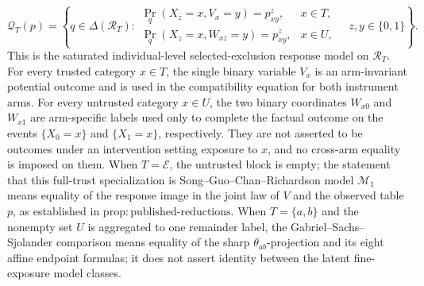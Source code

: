 \[
\mathcal Q_T(p)=\left\{q\in\Delta(\mathcal R_T):
\begin{array}{ll}
\Pr_q(X_z=x,V_x=y)=p^z_{xy},
  &x\in T,\\
\Pr_q(X_z=x,W_{xz}=y)=p^z_{xy},
  &x\in U,
\end{array}
\quad z,y\in\{0,1\}\right\}.
\]
This is the saturated individual-level selected-exclusion response model on \(\mathcal R_T\).  For every trusted category \(x\in T\), the single binary variable \(V_x\) is an arm-invariant potential outcome and is used in the compatibility equation for both instrument arms.  For every untrusted category \(x\in U\), the two binary coordinates \(W_{x0}\) and \(W_{x1}\) are arm-specific labels used only to complete the factual outcome on the events \(\{X_0=x\}\) and \(\{X_1=x\}\), respectively.  They are not asserted to be outcomes under an intervention setting exposure to \(x\), and no cross-arm equality is imposed on them.  When \(T=\mathcal E\), the untrusted block is empty; the statement that this full-trust specialization is Song--Guo--Chan--Richardson model \(\mathcal M_1\) means equality of the response image in the joint law of \(V\) and the observed table \(p\), as established in \(\mathrm{prop{:}published\mbox{-}reductions}\).  When \(T=\{a,b\}\) and the nonempty set \(U\) is aggregated to one remainder label, the Gabriel--Sachs--Sjolander comparison means equality of the sharp \(\theta_{ab}\)-projection and its eight affine endpoint formulas; it does not assert identity between the latent fine-exposure model classes.
